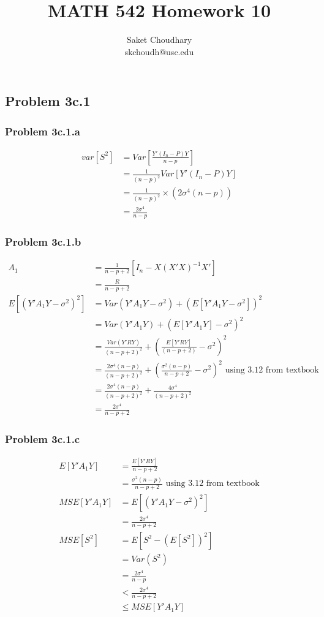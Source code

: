 \documentclass[a4paper]{article}
\title{MATH 542 Homework 10}
\author{Saket Choudhary\\skchoudh@usc.edu}
\begin{document}
\maketitle 
\subsection*{Problem 3c.1}

\subsubsection*{Problem 3c.1.a}
\begin{align*}
var[S^2]  &= Var[\frac{Y'(I_n-P)Y}{n-p}]\\
&= \frac{1}{(n-p)^2}Var[Y'(I_n-P)Y]\\
&= \frac{1}{(n-p)^2}\times (2\sigma^4(n-p))\\
&= \frac{2\sigma^4}{n-p}
\end{align*}

\subsubsection*{Problem 3c.1.b}
\begin{align*}
A_1 &= \frac{1}{n-p+2}[I_n-X(X'X)^{-1}X']\\
&= \frac{R}{n-p+2}\\
E[(Y'A_1Y-\sigma^2)^2] &= Var(Y'A_1Y-\sigma^2) + (E[Y'A_1Y-\sigma^2])^2\\ 
&= Var(Y'A_1Y) + (E[Y'A_1Y]-\sigma^2)^2\\
&= \frac{Var(Y'RY)}{(n-p+2)^2} + ( \frac{E[Y'RY]}{(n-p+2)}-\sigma^2)^2\\
&= \frac{2\sigma^4(n-p)}{(n-p+2)^2} + (\frac{\sigma^2(n-p)}{n-p+2}-\sigma^2)^2 \text{ using 3.12 from textbook}\\
&= \frac{2\sigma^4(n-p)}{(n-p+2)^2} + \frac{4\sigma^4}{(n-p+2)^2}\\
&= \frac{2\sigma^4}{n-p+2}
\end{align*} 

\subsubsection*{Problem 3c.1.c}
\begin{align*}
E[Y'A_1Y] &= \frac{E[Y'RY]}{n-p+2}\\
&= \frac{\sigma^2(n-p)}{n-p+2}\text{ using 3.12 from textbook}\\
MSE[Y'A_1Y] &= E[(Y'A_1Y-\sigma^2)^2]\\
&= \frac{2\sigma^4}{n-p+2}\\
MSE[S^2] &= E[S^2-(E[S^2])^2]\\
&= Var(S^2)\\
&= \frac{2\sigma^4}{n-p}\\
&<\frac{2\sigma^4}{n-p+2}\\
&\leq MSE[Y'A_1Y]
\end{align*}
\end{document}
